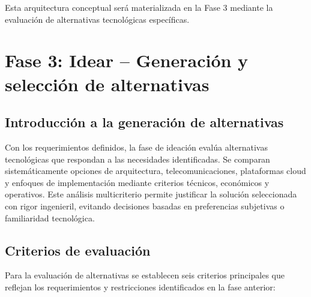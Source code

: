 Esta arquitectura conceptual será materializada en la Fase 3 mediante la evaluación de alternativas tecnológicas específicas.

\section{Fase 3: Idear – Generación y selección de alternativas}

\subsection{Introducción a la generación de alternativas}

Con los requerimientos definidos, la fase de ideación evalúa alternativas tecnológicas que respondan a las necesidades identificadas. Se comparan sistemáticamente opciones de arquitectura, telecomunicaciones, plataformas cloud y enfoques de implementación mediante criterios técnicos, económicos y operativos. Este análisis multicriterio permite justificar la solución seleccionada con rigor ingenieril, evitando decisiones basadas en preferencias subjetivas o familiaridad tecnológica.

\subsection{Criterios de evaluación}

Para la evaluación de alternativas se establecen seis criterios principales que reflejan los requerimientos y restricciones identificados en la fase anterior:

